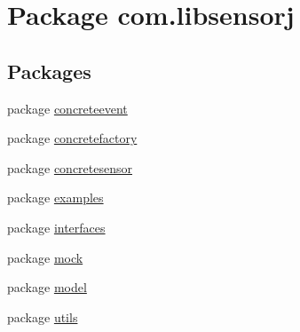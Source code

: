 \hypertarget{namespacecom_1_1libsensorj}{}\section{Package com.\+libsensorj}
\label{namespacecom_1_1libsensorj}
\subsection*{Packages}
\begin{DoxyCompactItemize}
\item 
package \hyperlink{namespacecom_1_1libsensorj_1_1concreteevent}{concreteevent}
\item 
package \hyperlink{namespacecom_1_1libsensorj_1_1concretefactory}{concretefactory}
\item 
package \hyperlink{namespacecom_1_1libsensorj_1_1concretesensor}{concretesensor}
\item 
package \hyperlink{namespacecom_1_1libsensorj_1_1examples}{examples}
\item 
package \hyperlink{namespacecom_1_1libsensorj_1_1interfaces}{interfaces}
\item 
package \hyperlink{namespacecom_1_1libsensorj_1_1mock}{mock}
\item 
package \hyperlink{namespacecom_1_1libsensorj_1_1model}{model}
\item 
package \hyperlink{namespacecom_1_1libsensorj_1_1utils}{utils}
\end{DoxyCompactItemize}

